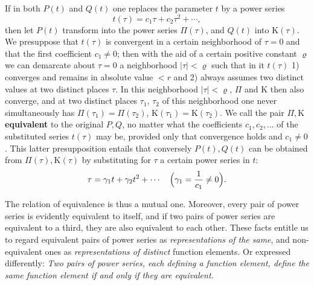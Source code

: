 \documentclass{article}
\begin{document}
If in both $P(t)$ and $Q(t)$ one replaces the parameter $t$ by a power series
\[ t(\tau) = c_1 \tau + c_2 \tau^2 + \cdots, \]
then let $P(t)$ transform into the power series $\Pi(\tau)$, and $Q(t)$ into $\mathrm{K}(\tau)$. We presuppose that $t(\tau)$ is convergent in a certain neighborhood of $\tau = 0$ and that the first coefficient $c_1 \neq 0$; then with the aid of a certain positive constant $\varrho$ we can demarcate about $\tau = 0$ a neighborhood $|\tau| < \varrho$ such that in it $t(\tau)$ 1) converges and remains in absolute value $< r$ and 2) always assumes two distinct values at two distinct places $\tau$. In this neighborhood $|\tau| < \varrho$, $\Pi$ and $\mathrm{K}$ then also converge, and at two distinct places $\tau_1$, $\tau_2$ of this neighborhood one never simultaneously has $\Pi(\tau_1) = \Pi(\tau_2)$, $\mathrm{K}(\tau_1) = \mathrm{K}(\tau_2)$. We call the pair $\Pi, \mathrm{K}$ \textbf{equivalent} to the original $P, Q$, no matter what the coefficients $c_1, c_2, \dots$ of the substituted series $t(\tau)$ may be, provided only that convergence holds and $c_1 \neq 0$. This latter presupposition entails that conversely $P(t), Q(t)$ can be obtained from $\Pi(\tau), \mathrm{K}(\tau)$ by substituting for $\tau$ a certain power series in $t$:
\[ \tau = \gamma_1 t + \gamma_2 t^2 + \cdots \quad \Bigl(\gamma_1 = \frac{1}{c_1} \neq 0\Bigr). \]

The relation of equivalence is thus a mutual one. Moreover, every pair of power series is evidently equivalent to itself, and if two pairs of power series are equivalent to a third, they are also equivalent to each other. These facts entitle us to regard equivalent pairs of power series as \emph{representations of the same}, and non-equivalent ones as \emph{representations of distinct} function elements. Or expressed differently: \emph{Two pairs of power series, each defining a function element, define the same function element if and only if they are equivalent.}
\end{document}
